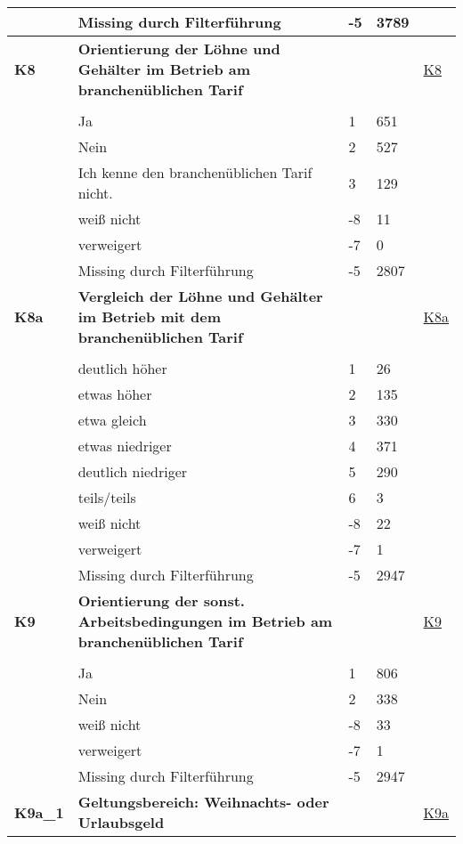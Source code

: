 \begin{longtable}{| L{2.5cm} | L{8.25cm}| C{1.5cm} | R{1.25cm} | C{2.25cm} |  }
   & Missing durch Filterführung & -5 & 3789 &  \\ 
   \midrule
\textbf{K8}\label{var:suf:K8} & \textbf{Orientierung der Löhne und Gehälter im Betrieb am branchenüblichen Tarif} &  &  & \hyperref[K8]{K8} \\ 
   &  &  &  &  \\ 
   & Ja & 1 & 651 &  \\ 
   & Nein & 2 & 527 &  \\ 
   & Ich kenne den branchenüblichen Tarif nicht. & 3 & 129 &  \\ 
   & weiß nicht & -8 & 11 &  \\ 
   & verweigert & -7 & 0 &  \\ 
   & Missing durch Filterführung & -5 & 2807 &  \\ 
   \midrule
\textbf{K8a}\label{var:suf:K8a} & \textbf{Vergleich der Löhne und Gehälter im Betrieb mit dem branchenüblichen Tarif} &  &  & \hyperref[K8a]{K8a} \\ 
   &  &  &  &  \\ 
   & deutlich höher & 1 & 26 &  \\ 
   & etwas höher & 2 & 135 &  \\ 
   & etwa gleich & 3 & 330 &  \\ 
   & etwas niedriger & 4 & 371 &  \\ 
   & deutlich niedriger & 5 & 290 &  \\ 
   & teils/teils & 6 & 3 &  \\ 
   & weiß nicht & -8 & 22 &  \\ 
   & verweigert & -7 & 1 &  \\ 
   & Missing durch Filterführung & -5 & 2947 &  \\ 
   \midrule
\textbf{K9}\label{var:suf:K9} & \textbf{Orientierung der sonst. Arbeitsbedingungen im Betrieb am branchenüblichen Tarif} &  &  & \hyperref[K9]{K9} \\ 
   &  &  &  &  \\ 
   & Ja & 1 & 806 &  \\ 
   & Nein & 2 & 338 &  \\ 
   & weiß nicht & -8 & 33 &  \\ 
   & verweigert & -7 & 1 &  \\ 
   & Missing durch Filterführung & -5 & 2947 &  \\ 
   \midrule
\textbf{K9a\_1}\label{var:suf:K9a:1} & \textbf{Geltungsbereich: Weihnachts- oder Urlaubsgeld} &  &  & \hyperref[K9a]{K9a} \\ 

\end{longtable}
